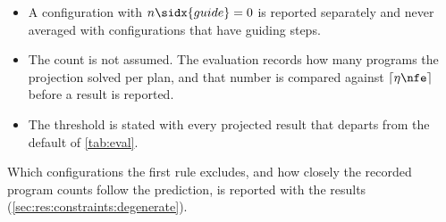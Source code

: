 \begin{itemize}
  \item A configuration with $n\sidx{guide}=0$ is reported separately and never averaged with
    configurations that have guiding steps.
  \item The count is not assumed. The evaluation records how many programs the projection solved per
    plan, and that number is compared against $\lceil \eta\nfe \rceil$ before a result is reported.
  \item The threshold is stated with every projected result that departs from the default of
    \autoref{tab:eval}.
\end{itemize}

Which configurations the first rule excludes, and how closely the recorded program counts follow the
prediction, is reported with the results (\autoref{sec:res:constraints:degenerate}).
